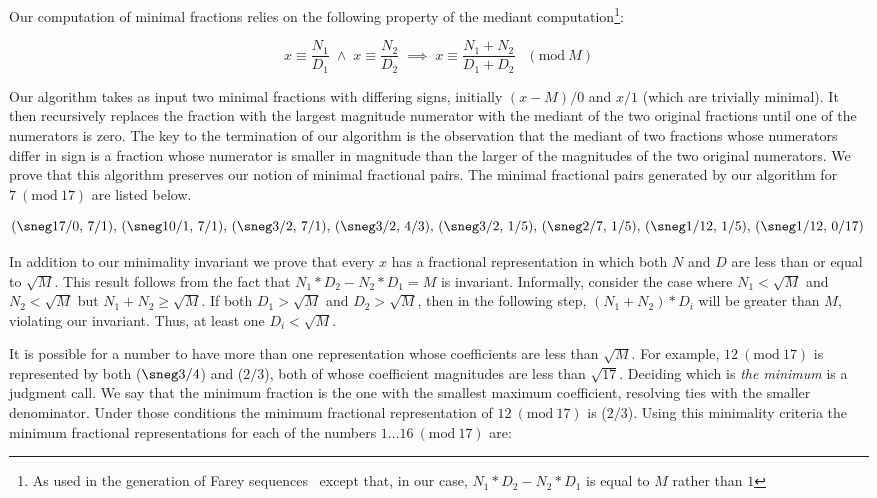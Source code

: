 \documentclass[submission,copyright,creativecommons]{eptcs}
\newcommand{\Mod}[1]{\ (\mathrm{mod}\ #1)}
\begin{document}
Our computation of minimal fractions relies on the following property
of the mediant computation\footnote{As used in the generation of Farey
  sequences~\cite{Farey} except that, in our case, $N_1*D_2 - N_2*D_1$
  is equal to $M$ rather than $1$}:

\begin{equation*}
x \equiv \frac{N_1}{D_1} \; \land \;
x \equiv \frac{N_2}{D_2} \; \implies \;
x \equiv \frac{N_1 + N_2}{D_1 + D_2} \; \; \Mod{M}
\end{equation*}

Our algorithm takes as input two minimal fractions with differing
signs, initially $(x-M)/0$ and $x/1$ (which are trivially minimal).  It
then recursively replaces the fraction with the largest magnitude
numerator with the mediant of the two original fractions until one of
the numerators is zero.  The key to the termination of our algorithm
is the observation that the mediant of two fractions whose numerators
differ in sign is a fraction whose numerator is smaller in magnitude
than the larger of the magnitudes of the two original numerators.  We
prove that this algorithm preserves our notion of minimal fractional pairs.
The minimal fractional pairs generated by our algorithm
for $7 \Mod{17}$ are listed below.

{\small
\[
(\sneg17/0,\,7/1),\,
(\sneg10/1,\,7/1),\,(\sneg3/2,\,7/1),\,(\sneg3/2,\,4/3),\,(\sneg3/2,\,1/5),\,(\sneg2/7,\,1/5),\,(\sneg1/12,\,1/5),\,
(\sneg1/12,\,0/17)\,
\]
}

In addition to our minimality invariant we prove that every $x$ has a fractional
representation in which both $N$ and $D$ are less than or equal to
$\sqrt{M}$.  This result follows from the fact that $N_1*D_2 - N_2*D_1 = M$
is invariant.  Informally, consider the case where $N_1 < \sqrt{M}$ and
$N_2 < \sqrt{M}$ but $N_1 + N_2 \geq \sqrt{M}$.  If both $D_1 > \sqrt{M}$ and
$D_2 > \sqrt{M}$, then in the following step, $(N_1 + N_2)*D_i$ will be
greater than $M$, violating our invariant.  Thus, at
least one $D_i < \sqrt{M}$.

It is possible for a number to have more than one representation whose
coefficients are less than $\sqrt{M}$.  For example, $12 \Mod{17}$ is
represented by both ($\sneg3/4$) and ($2/3$), both of whose
coefficient magnitudes are less than $\sqrt{17}$.  Deciding which is
\emph{the minimum} is a judgment call.  We say that the minimum
fraction is the one with the smallest maximum coefficient, resolving
ties with the smaller denominator.  Under those conditions the
minimum fractional representation of $12 \Mod{17}$ is ($2/3$).  Using
this minimality criteria the minimum fractional representations for
each of the numbers $1\dots16 \Mod{17}$ are:
\end{document}
